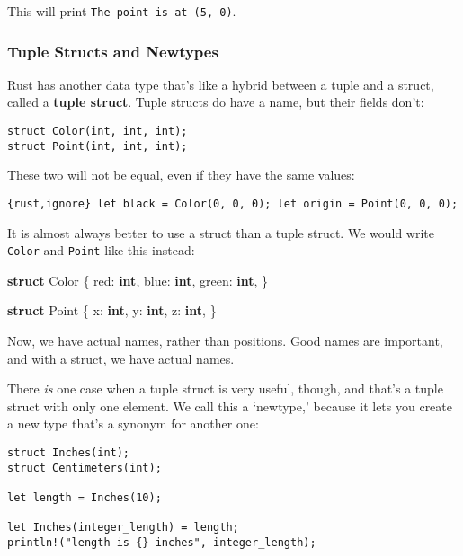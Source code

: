 \documentclass[]{article}
\newenvironment{Shaded}{}{}
\newcommand{\KeywordTok}[1]{\textcolor[rgb]{0.00,0.44,0.13}{\textbf{{#1}}}}
\newcommand{\NormalTok}[1]{{#1}}
\begin{document}
This will print \texttt{The point is at (5, 0)}.

\subsubsection{Tuple Structs and
Newtypes}\label{tuple-structs-and-newtypes}

Rust has another data type that's like a hybrid between a tuple and a
struct, called a \textbf{tuple struct}. Tuple structs do have a name,
but their fields don't:

\begin{verbatim}
struct Color(int, int, int);
struct Point(int, int, int);
\end{verbatim}

These two will not be equal, even if they have the same values:

\texttt{\{rust,ignore\} let black  = Color(0, 0, 0); let origin = Point(0, 0, 0);}

It is almost always better to use a struct than a tuple struct. We would
write \texttt{Color} and \texttt{Point} like this instead:

\begin{Shaded}
\begin{Highlighting}[]
\KeywordTok{struct} \NormalTok{Color \{}
    \NormalTok{red: }\KeywordTok{int}\NormalTok{,}
    \NormalTok{blue: }\KeywordTok{int}\NormalTok{,}
    \NormalTok{green: }\KeywordTok{int}\NormalTok{,}
\NormalTok{\}}

\KeywordTok{struct} \NormalTok{Point \{}
    \NormalTok{x: }\KeywordTok{int}\NormalTok{,}
    \NormalTok{y: }\KeywordTok{int}\NormalTok{,}
    \NormalTok{z: }\KeywordTok{int}\NormalTok{,}
\NormalTok{\}}
\end{Highlighting}
\end{Shaded}

Now, we have actual names, rather than positions. Good names are
important, and with a struct, we have actual names.

There \emph{is} one case when a tuple struct is very useful, though, and
that's a tuple struct with only one element. We call this a `newtype,'
because it lets you create a new type that's a synonym for another one:

\begin{verbatim}
struct Inches(int);
struct Centimeters(int);

let length = Inches(10);

let Inches(integer_length) = length;
println!("length is {} inches", integer_length);
\end{verbatim}
\end{document}
